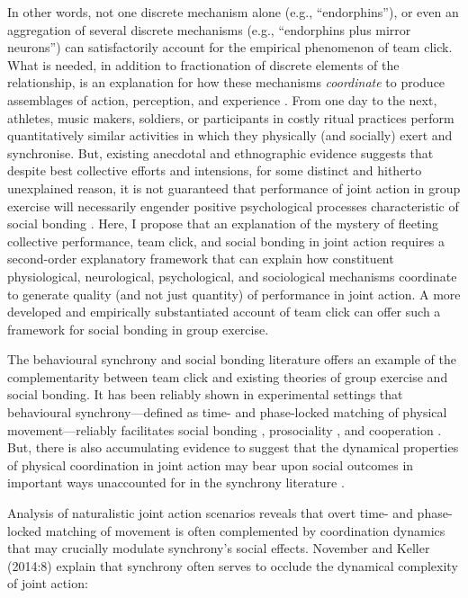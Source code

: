 In other words, not one discrete mechanism alone (e.g., ``endorphins''), or even an aggregation of several discrete mechanisms (e.g., ``endorphins plus mirror neurons'') can satisfactorily account for the empirical phenomenon of team click.  What is needed, in addition to fractionation of discrete elements of the relationship, is an explanation for how these mechanisms \textit{coordinate} to produce assemblages of action, perception, and experience \citep{Kelso2013}.  From one day to the next, athletes, music makers, soldiers, or participants in costly ritual practices perform quantitatively similar activities in which they physically (and socially) exert and synchronise.  But, existing anecdotal and ethnographic evidence suggests that despite best collective efforts and intensions, for some distinct and hitherto unexplained reason, it is not guaranteed that performance of joint action in group exercise will necessarily engender positive psychological processes characteristic of social bonding \citep[e.g.,][]{King2011}.  Here, I propose that an explanation of the mystery of fleeting collective performance, team click, and social bonding in joint action requires a second-order explanatory framework that can explain how constituent physiological, neurological, psychological, and sociological mechanisms coordinate to generate quality (and not just quantity) of performance in joint action. A more developed and empirically substantiated account of team click can offer such a framework for social bonding in group exercise.

The behavioural synchrony and social bonding literature offers an example of the complementarity between team click and existing theories of group exercise and social bonding.  It has been reliably shown in experimental settings that behavioural synchrony—defined as time- and phase-locked matching of physical movement—reliably facilitates social bonding \citep{Launay2016}, prosociality \citep{Kirschner2010}, and cooperation \citep{Reddish2013}.  But, there is also accumulating evidence to suggest that the dynamical properties of physical coordination in joint action may bear upon social outcomes in important ways unaccounted for in the synchrony literature \citep{Fusaroli2014}.

Analysis of naturalistic joint action scenarios reveals that overt time- and phase-locked matching of movement is often complemented by coordination dynamics that may crucially modulate synchrony's social effects.  November and Keller (2014:8) explain that synchrony often serves to occlude the dynamical complexity of joint action:

